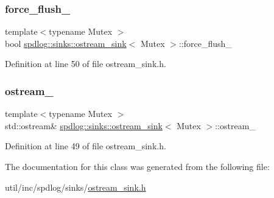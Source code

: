 \subsubsection{\texorpdfstring{force\+\_\+flush\+\_\+}{force\_flush\_}}
{\footnotesize\ttfamily template$<$typename Mutex $>$ \\
bool \hyperlink{classspdlog_1_1sinks_1_1ostream__sink}{spdlog\+::sinks\+::ostream\+\_\+sink}$<$ Mutex $>$\+::force\+\_\+flush\+\_\+\hspace{0.3cm}{\ttfamily [protected]}}



Definition at line 50 of file ostream\+\_\+sink.\+h.

\mbox{\label{classspdlog_1_1sinks_1_1ostream__sink_a53db4ea84203737b100365438d1951b4}} 
\subsubsection{\texorpdfstring{ostream\+\_\+}{ostream\_}}
{\footnotesize\ttfamily template$<$typename Mutex $>$ \\
std\+::ostream\& \hyperlink{classspdlog_1_1sinks_1_1ostream__sink}{spdlog\+::sinks\+::ostream\+\_\+sink}$<$ Mutex $>$\+::ostream\+\_\+\hspace{0.3cm}{\ttfamily [protected]}}



Definition at line 49 of file ostream\+\_\+sink.\+h.



The documentation for this class was generated from the following file\+:\begin{DoxyCompactItemize}
\item 
util/inc/spdlog/sinks/\hyperlink{ostream__sink_8h}{ostream\+\_\+sink.\+h}\end{DoxyCompactItemize}
